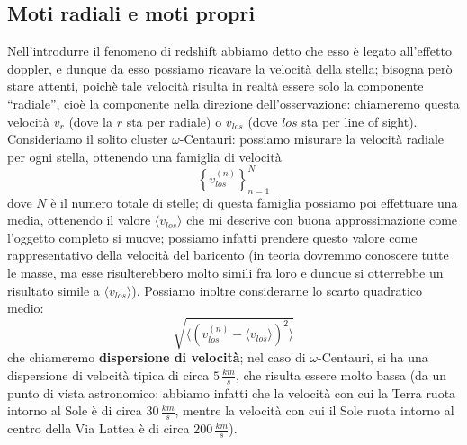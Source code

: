 \subsection{Moti radiali e moti propri}
Nell'introdurre il fenomeno di redshift abbiamo detto che esso è legato all'effetto doppler, e dunque da esso possiamo ricavare la velocità della stella; bisogna però stare attenti, poichè tale velocità risulta in realtà essere solo la componente ``radiale'', cioè la componente nella direzione dell'osservazione: chiameremo questa velocità $v_r$ (dove la $r$ sta per radiale) o $v_{los}$ (dove $los$ sta per line of sight).
\\
Consideriamo il solito cluster $\omega$-Centauri: possiamo misurare la velocità radiale per ogni stella, ottenendo una famiglia di velocità
$$\left\{ v_{los} ^{(n)} \right\}_{n=1} ^N$$
dove $N$ è il numero totale di stelle; di questa famiglia possiamo poi effettuare una media, ottenendo il valore $\langle v_{los} \rangle$  che mi descrive con buona approssimazione come l'oggetto completo si muove; possiamo infatti prendere questo valore come rappresentativo della velocità del baricento (in teoria dovremmo conoscere tutte le masse, ma esse risulterebbero molto simili fra loro e dunque si otterrebbe un risultato simile a $\langle v_{los} \rangle$). Possiamo inoltre considerarne lo scarto quadratico medio: $$\sqrt{\langle \left(v_{los}^{(n)}- \langle v_{los} \rangle \right)^2 \rangle}$$
che chiameremo \textbf{dispersione di velocità}; nel caso di $\omega$-Centauri, si ha una dispersione di velocità tipica di circa $5 \, \frac{km}{s}$, che risulta essere molto bassa (da un punto di vista astronomico: abbiamo infatti che la velocità con cui la Terra ruota intorno al Sole è di circa $30 \, \frac{km}{s}$, mentre la velocità con cui il Sole ruota intorno al centro della Via Lattea è di circa $200 \, \frac{km}{s}$).

